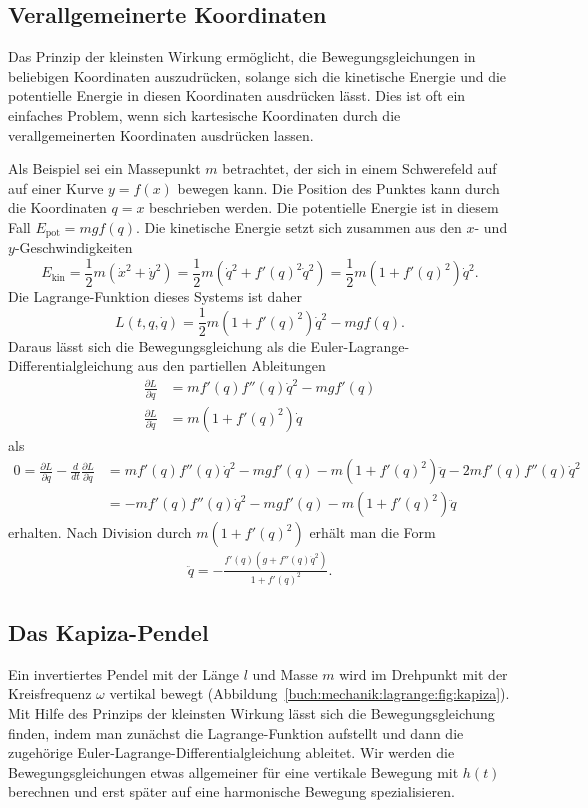 %
%
\subsection{Verallgemeinerte Koordinaten
\label{buch:mechanik:lagrange:subsection:koordinaten}}
Das Prinzip der kleinsten Wirkung ermöglicht, die Bewegungsgleichungen
in beliebigen Koordinaten auszudrücken, solange sich die kinetische
Energie und die potentielle Energie in diesen Koordinaten ausdrücken
lässt.
Dies ist oft ein einfaches Problem, wenn sich kartesische Koordinaten
durch die verallgemeinerten Koordinaten ausdrücken lassen.

Als Beispiel sei ein Massepunkt $m$ betrachtet, der sich in einem
Schwerefeld auf auf einer Kurve $y=f(x)$ bewegen kann.
Die Position des Punktes kann durch die Koordinaten $q=x$ beschrieben
werden.
Die potentielle Energie ist in diesem Fall $E_{\text{pot}} = mgf(q)$.
Die kinetische Energie setzt sich zusammen aus den $x$- und
$y$-Geschwindigkeiten
\[
E_{\text{kin}}
=
\frac12m(\dot{x}^2 + \dot{y}^2)
=
\frac12m(\dot{q}^2 + f'(q)^2 \dot{q}^2)
=
\frac12m(1+f'(q)^2)\dot{q}^2.
\]
Die Lagrange-Funktion dieses Systems ist daher 
\[
L(t,q,\dot{q})
=
\frac12m(1+f'(q)^2)\dot{q}^2 - mgf(q).
\]
Daraus lässt sich die Bewegungsgleichung als die
Euler-Lagrange-Differentialgleichung aus den partiellen Ableitungen
\begin{align*}
\frac{\partial L}{\partial q}
&=
mf'(q)f''(q)\dot{q}^2 - mgf'(q)
\\
\frac{\partial L}{\partial\dot{q}}
&=
m(1+f'(q)^2)\dot{q}
\end{align*}
als
\begin{align*}
0
=
\frac{\partial L}{\partial q}-\frac{d}{dt}\frac{\partial L}{\partial\dot{q}}
&=
mf'(q)f''(q)\dot{q}^2
-
mgf'(q)
-
m(1+f'(q)^2)\ddot{q}
-
2mf'(q)f''(q)\dot{q}^2
\\
&=
-
mf'(q)f''(q)\dot{q}^2
-
mgf'(q)
-
m(1+f'(q)^2)\ddot{q}
\end{align*}
erhalten.
Nach Division durch $m(1+f'(q)^2)$ erhält man die Form
\begin{align*}
\ddot{q}
=
-
\frac{f'(q)(g+f''(q)\dot{q}^2)}{1+f'(q)^2}.
\end{align*}


%
%
\subsection{Das Kapiza-Pendel
\label{buch:mechanik:lagrange:subsection:kapiza}}

Ein invertiertes Pendel mit der Länge $l$ und Masse $m$ wird im
Drehpunkt mit der Kreisfrequenz $\omega$ vertikal bewegt
(Abbildung~\ref{buch:mechanik:lagrange:fig:kapiza}).
Mit Hilfe des Prinzips der kleinsten Wirkung lässt sich die
Bewegungsgleichung finden, indem man zunächst die Lagrange-Funktion
aufstellt und dann die zugehörige Euler-Lagrange-Differentialgleichung
ableitet.
Wir werden die Bewegungsgleichungen etwas allgemeiner für eine
vertikale Bewegung mit $h(t)$ berechnen und erst später auf eine
harmonische Bewegung spezialisieren.

